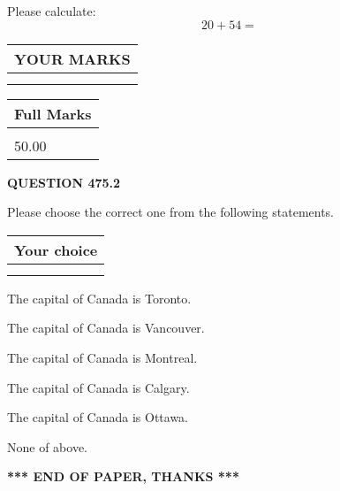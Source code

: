 \documentclass[12pt]{article}
\begin{document}
  
 
Please calculate:
\begin{equation}
20 +  %
54 = \nonumber
\end{equation}
 

 

 
  
\vspace{0.2in}
  
\noindent\begin{tabular}{|l|}
\hline
 YOUR MARKS  \\
\hline
 \\ 
 \\ 
\hline
\end{tabular}
\hspace{0.05in} \begin{tabular}{|l|}
\hline
 Full Marks  \\
\hline
 \\ 
50.00 \\
\hline
\end{tabular}
{\textbf{\Large{QUESTION
475.2 
}}}
  
  
Please choose the correct one from the following statements.
  
  
\noindent\hspace{3.0in} \begin{tabular}{|l|}
\hline
Your choice \\
\hline
 \\ 
 \\ 
\hline
\end{tabular}
  
  
 
 
The capital of Canada is Toronto.
 
 
The capital of Canada is Vancouver.
 
 
The capital of Canada is Montreal.
 
 
The capital of Canada is Calgary.
 
 
The capital of Canada is Ottawa.
 
 
 None of above.
 
 
   
   
 \vspace{0.2in}
 
   
   
   
   
\vspace{1.0in} 
{\textbf{\large{ *** END OF PAPER, THANKS *** }}} 
   
\end{document}
